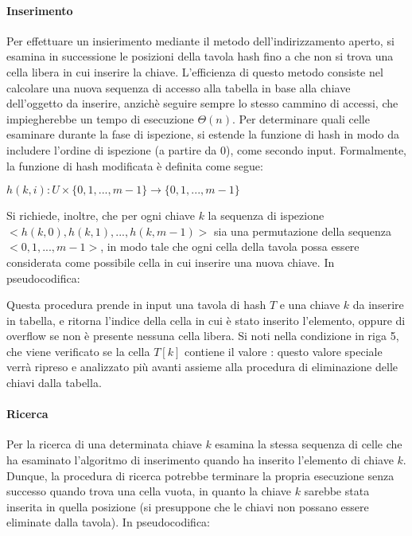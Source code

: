 \paragraph{Inserimento}
Per effettuare un insierimento mediante il metodo dell'indirizzamento aperto, si esamina in successione le posizioni della tavola hash fino a che non si trova una cella libera in cui inserire la chiave. L'efficienza di questo metodo consiste nel calcolare una nuova sequenza di accesso alla tabella in base alla chiave dell'oggetto da inserire, anzichè seguire sempre lo stesso cammino di accessi, che impiegherebbe un tempo di esecuzione \(\Theta(n)\). Per determinare quali celle esaminare durante la fase di ispezione, si estende la funzione di hash in modo da includere l'ordine di ispezione (a partire da 0), come secondo input. Formalmente, la funzione di hash modificata è definita come segue:

\(h(k,i):U\times \{0,1,...,m-1\} \to \{0,1,...,m-1\}\)

\noindent Si richiede, inoltre, che per ogni chiave \(k\) la sequenza di ispezione \(<h(k,0), h(k,1),..., h(k,m-1)>\) sia una permutazione della sequenza \(<0,1,...,m-1>\), in modo tale che ogni cella della tavola possa essere considerata come possibile cella in cui inserire una nuova chiave. In pseudocodifica:



Questa procedura prende in input una tavola di hash \(T\) e una chiave \(k\) da inserire in tabella, e ritorna l'indice della cella in cui è stato inserito l'elemento, oppure  di overflow se non è presente nessuna cella libera. Si noti nella condizione in riga 5, che viene verificato se la cella \(T[k]\) contiene il valore : questo valore speciale verrà ripreso e analizzato più avanti assieme alla procedura di eliminazione delle chiavi dalla tabella.

\paragraph{Ricerca}
Per la ricerca di una determinata chiave \(k\) esamina la stessa sequenza di celle che ha esaminato l'algoritmo di inserimento quando ha inserito l'elemento di chiave \(k\). Dunque, la procedura di ricerca potrebbe terminare la propria esecuzione senza successo quando trova una cella vuota, in quanto la chiave \(k\) sarebbe stata inserita in quella posizione (si presuppone che le chiavi non possano essere eliminate dalla tavola). In pseudocodifica:


